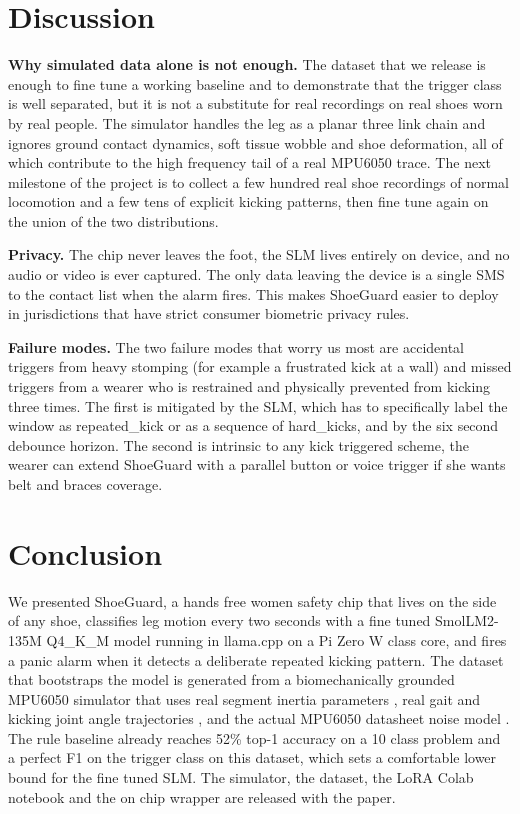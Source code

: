 \documentclass[conference]{IEEEtran}
\begin{document}
\section{Discussion}

\textbf{Why simulated data alone is not enough.} The dataset that we release is enough to fine tune a working baseline and to demonstrate that the trigger class is well separated, but it is not a substitute for real recordings on real shoes worn by real people. The simulator handles the leg as a planar three link chain and ignores ground contact dynamics, soft tissue wobble and shoe deformation, all of which contribute to the high frequency tail of a real MPU6050 trace. The next milestone of the project is to collect a few hundred real shoe recordings of normal locomotion and a few tens of explicit kicking patterns, then fine tune again on the union of the two distributions.

\textbf{Privacy.} The chip never leaves the foot, the SLM lives entirely on device, and no audio or video is ever captured. The only data leaving the device is a single SMS to the contact list when the alarm fires. This makes ShoeGuard easier to deploy in jurisdictions that have strict consumer biometric privacy rules.

\textbf{Failure modes.} The two failure modes that worry us most are accidental triggers from heavy stomping (for example a frustrated kick at a wall) and missed triggers from a wearer who is restrained and physically prevented from kicking three times. The first is mitigated by the SLM, which has to specifically label the window as repeated\_kick or as a sequence of hard\_kicks, and by the six second debounce horizon. The second is intrinsic to any kick triggered scheme, the wearer can extend ShoeGuard with a parallel button or voice trigger if she wants belt and braces coverage.

\section{Conclusion}

We presented ShoeGuard, a hands free women safety chip that lives on the side of any shoe, classifies leg motion every two seconds with a fine tuned SmolLM2-135M Q4\_K\_M model running in llama.cpp on a Pi Zero W class core, and fires a panic alarm when it detects a deliberate repeated kicking pattern. The dataset that bootstraps the model is generated from a biomechanically grounded MPU6050 simulator that uses real segment inertia parameters \cite{deleva1996}, real gait and kicking joint angle trajectories \cite{winter2009biomechanics, lees2010biomechanics, kellis2007biomechanical}, and the actual MPU6050 datasheet noise model \cite{invensense2013mpu6050}. The rule baseline already reaches 52\% top-1 accuracy on a 10 class problem and a perfect F1 on the trigger class on this dataset, which sets a comfortable lower bound for the fine tuned SLM. The simulator, the dataset, the LoRA Colab notebook and the on chip wrapper are released with the paper.
\end{document}
